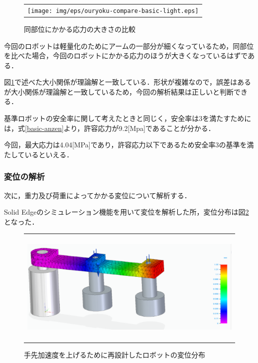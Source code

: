 \begin{figure}[htbp]
  \begin{center}
    \begin{tabular}{c}
      \texttt{[image: img/eps/ouryoku-compare-basic-light.eps]}
    \end{tabular}
    \caption{同部位にかかる応力の大きさの比較}
    \label{ouryoku-compare-basic-light}
  \end{center}
\end{figure}

今回のロボットは軽量化のためにアームの一部分が細くなっているため，同部位を比べた場合，今回のロボットにかかる応力のほうが大きくなっているはずである．

図\ref{ouryoku-compare-basic-light}で述べた大小関係が理論解と一致している．形状が複雑なので，誤差はあるが大小関係が理論解と一致しているため，今回の解析結果は正しいと判断できる．

基準ロボットの安全率に関して考えたときと同じく，安全率は3を満たすためには，式\ref{basic-anzen}より，許容応力が9.2{[}Mpa{]}であることが分かる．

今回，最大応力は4.04{[}MPa{]}であり，許容応力以下であるため安全率3の基準を満たしているといえる．

\subsubsection{変位の解析}\label{ux5909ux4f4dux306eux89e3ux6790}

次に，重力及び荷重によってかかる変位について解析する．

Solid
Edgeのシミュレーション機能を用いて変位を解析した所，変位分布は図\ref{light-heni}となった．

\begin{figure}[htbp]
  \begin{center}
    \begin{tabular}{c}
      \includegraphics[height=5.5cm]{img/eps/light-heni.eps}
    \end{tabular}
    \caption{手先加速度を上げるために再設計したロボットの変位分布}
    \label{light-heni}
  \end{center}
\end{figure}

